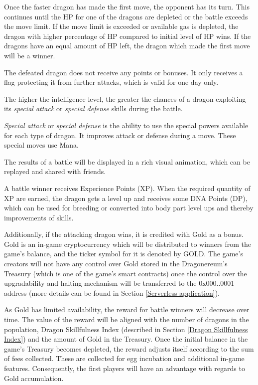 \documentclass[12pt]{article}
\begin{document}
Once the faster dragon has made the first move, the opponent has its turn. This continues until the HP for one of the dragons are depleted or the battle exceeds the move limit. If the move limit is exceeded or available gas is depleted, the dragon with higher percentage of HP compared to initial level of HP wins. If the dragons have an equal amount of HP left, the dragon which made the first move will be a winner.\par

The defeated dragon does not receive any points or bonuses. It only receives a flag protecting it from further attacks, which is valid for one day only.\par

The higher the intelligence level, the greater the chances of a dragon exploiting its \textit{special attack} or \textit{special defense} skills during the battle.\par

\textit{Special attack} or \textit{special defense} is the ability to use the special powers available for each type of dragon. It improves attack or defense during a move. These special moves use Mana.\par

The results of a battle will be displayed in a rich visual animation, which can be replayed and shared with friends.\par

A battle winner receives Experience Points (XP). When the required quantity of XP are earned, the dragon gets a level up and receives some DNA Points (DP), which can be used for breeding or converted into body part level ups and thereby improvements of skills. \par

Additionally, if the attacking dragon wins, it is credited with Gold as a bonus. Gold is an in-game cryptocurrency which will be distributed to winners from the game’s balance, and the ticker symbol for it is denoted by GOLD. The game’s creators will not have any control over Gold stored in the Dragonereum’s Treasury (which is one of the game’s smart contracts) once the control over the upgradability and halting mechanism will be transferred to the 0x000..0001 address (more details can be found in Section \ref{Serverless application}).\par

As Gold has limited availability, the reward for battle winners will decrease over time. The value of the reward will be aligned with the number of dragons in the population, Dragon Skillfulness Index (described in Section \ref{Dragon Skillfulness Index}) and the amount of Gold in the Treasury. Once the initial balance in the game's Treasury becomes depleted, the reward adjusts itself according to the sum of fees collected. These are collected for egg incubation and additional in-game features. Consequently, the first players will have an advantage with regards to Gold accumulation.\par
\end{document}
